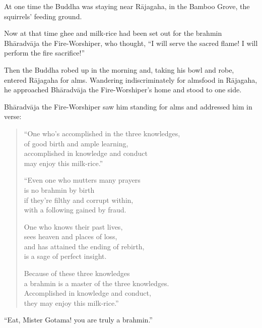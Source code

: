 \documentclass[12pt,openany]{book}%
\begin{document}
At one time the Buddha was staying near \textsanskrit{Rājagaha}, in the Bamboo Grove, the squirrels’ feeding ground. 

Now at that time ghee and milk-rice had been set out for the brahmin \textsanskrit{Bhāradvāja} the Fire-Worshiper, who thought, “I will serve the sacred flame! I will perform the fire sacrifice!” 

Then the Buddha robed up in the morning and, taking his bowl and robe, entered \textsanskrit{Rājagaha} for alms. Wandering indiscriminately for almsfood in \textsanskrit{Rājagaha}, he approached \textsanskrit{Bhāradvāja} the Fire-Worshiper’s home and stood to one side. 

\textsanskrit{Bhāradvāja} the Fire-Worshiper saw him standing for alms and addressed him in verse: 

\begin{verse}%
“One who’s accomplished in the three knowledges, \\
of good birth and ample learning, \\
accomplished in knowledge and conduct \\
may enjoy this milk-rice.” 

“Even one who mutters many prayers \\
is no brahmin by birth \\
if they’re filthy and corrupt within, \\
with a following gained by fraud. 

One who knows their past lives, \\
sees heaven and places of loss, \\
and has attained the ending of rebirth, \\
is a sage of perfect insight. 

Because of these three knowledges \\
a brahmin is a master of the three knowledges. \\
Accomplished in knowledge and conduct, \\
they may enjoy this milk-rice.” 

%
\end{verse}

“Eat, Mister Gotama! you are truly a brahmin.” 
\end{document}
